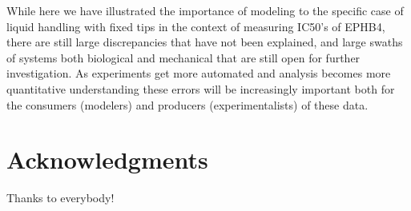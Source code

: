 \documentclass[aps,pre,twocolumn,nofootinbib,superscriptaddress,linenumbers]{revtex4-1}
\begin{document}
While here we have illustrated the importance of modeling to the specific case of liquid handling with fixed tips in the context of measuring IC50's of EPHB4, there are still large discrepancies that have not been explained, and large swaths of systems both biological and mechanical that are still open for further investigation. As experiments get more automated and analysis becomes more quantitative understanding these errors will be increasingly important both for the consumers (modelers) and producers (experimentalists) of these data.


\section{Acknowledgments}
\label{section:acknowledgments}

Thanks to everybody!


 

\end{document}
